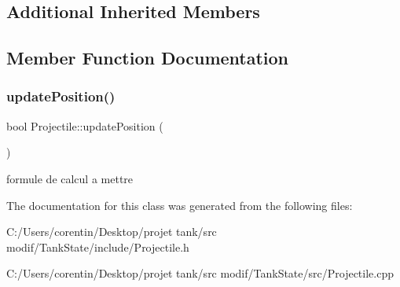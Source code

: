 \subsection*{Additional Inherited Members}


\subsection{Member Function Documentation}
\mbox{\label{class_projectile_ab667833975b19a5b1a5ab6c3722da3dd}} 
\subsubsection{\texorpdfstring{update\+Position()}{updatePosition()}}
{\footnotesize\ttfamily bool Projectile\+::update\+Position (\begin{DoxyParamCaption}{ }\end{DoxyParamCaption})}

formule de calcul a mettre 

The documentation for this class was generated from the following files\+:\begin{DoxyCompactItemize}
\item 
C\+:/\+Users/corentin/\+Desktop/projet tank/src modif/\+Tank\+State/include/Projectile.\+h\item 
C\+:/\+Users/corentin/\+Desktop/projet tank/src modif/\+Tank\+State/src/Projectile.\+cpp\end{DoxyCompactItemize}

